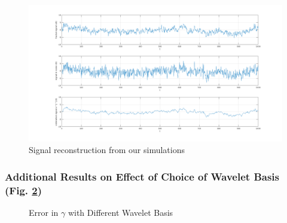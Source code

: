 \documentclass[a4paper]{article}
\begin{document}
\begin{figure}[ht]
\centering
\includegraphics[width=\textwidth]{reconstruction.png}
\caption{Signal reconstruction from our simulations}
\label{fig:reconstr_sim}
\end{figure}
\vspace{10 cm}
\subsubsection{Additional Results on Effect of Choice of Wavelet Basis (Fig. \ref{fig:gamma_wavelet})}

\begin{figure}[ht]
    \centering
   \qquad
    \caption{Error in $\gamma$ with Different Wavelet Basis}%
    \label{fig:gamma_wavelet}%
\end{figure}
\end{document}
